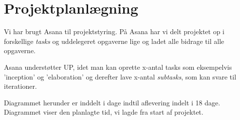\chapter{Projektplanlægning}

Vi har brugt Asana til projektstyring.
På Asana har vi delt projektet op i forskellige \textit{tasks} og uddelegeret opgaverne lige og ladet alle bidrage til alle opgaverne.

\noindent
Asana understøtter UP, idet man kan oprette x-antal tasks som eksempelvis 'inception' og 'elaboration' og derefter lave x-antal \textit{subtasks}, som kan svare til iterationer.

\noindent
Diagrammet herunder er inddelt i dage indtil aflevering indelt i 18 dage. 
\\ Diagrammet viser den planlagte tid, vi lagde fra start af projektet.
%
%
